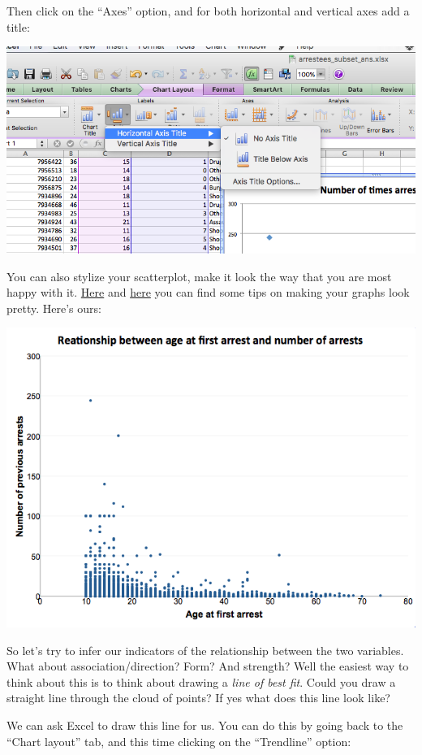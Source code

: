 \documentclass[
]{book}
\begin{document}
Then click on the ``Axes'' option, and for both horizontal and vertical axes add a title:

\includegraphics{imgs/scatter_8.png}

You can also stylize your scatterplot, make it look the way that you are most happy with it. \href{https://blog.hubspot.com/marketing/excel-graph-tricks-list}{Here} and \href{https://www.goskills.com/Excel/Resources/How-to-make-a-scatter-plot-in-Excel}{here} you can find some tips on making your graphs look pretty. Here's ours:

\includegraphics{imgs/scatter_9.png}

So let's try to infer our indicators of the relationship between the two variables. What about association/direction? Form? And strength? Well the easiest way to think about this is to think about drawing a \emph{line of best fit}. Could you draw a straight line through the cloud of points? If yes what does this line look like?

We can ask Excel to draw this line for us. You can do this by going back to the ``Chart layout'' tab, and this time clicking on the ``Trendline'' option:
\end{document}
